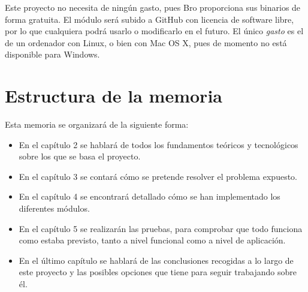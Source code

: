 Este proyecto no necesita de ningún gasto, pues Bro \cite{broindex} proporciona sus binarios de 
forma gratuita. El módulo será subido a GitHub \cite{repo} con licencia de software libre, por lo que cualquiera 
podrá usarlo o modificarlo en el futuro. El único \textit{gasto} es el de un ordenador con Linux, 
o bien con Mac OS X, pues de momento no está disponible para Windows. \cite{brodownload}

\section{Estructura de la memoria}

Esta memoria se organizará de la siguiente forma: 
\begin{itemize}
\item En el capítulo 2 se hablará de todos los fundamentos teóricos y tecnológicos sobre los que se 
basa el proyecto.
\item En el capítulo 3 se contará cómo se pretende resolver el problema expuesto.
\item En el capítulo 4 se encontrará detallado cómo se han implementado los diferentes módulos.
\item En el capítulo 5 se realizarán las pruebas, para comprobar que todo funciona como 
estaba previsto, tanto a nivel funcional como a nivel de aplicación.
\item En el último capítulo se hablará de las conclusiones recogidas a lo largo de este proyecto y las posibles 
opciones que tiene para seguir trabajando sobre él.
\end{itemize}
